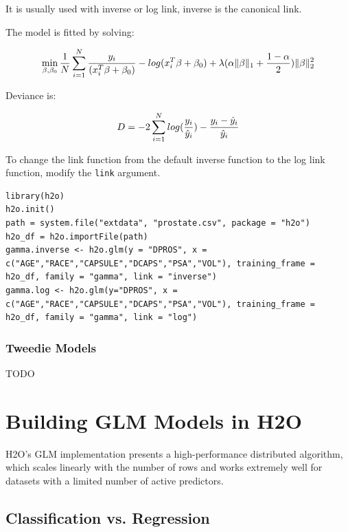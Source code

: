 It is usually used with inverse or log link, inverse is the canonical link.

The model is fitted by solving:

\[  \min\limits_{\beta,\beta_0} { {1 \over N}\sum\limits_{i=1}\limits^{N}{y_i \over (x_i^{T}\beta  + \beta_0)} - log({x_i^{T}\beta  + \beta_0})  + \lambda (\alpha \|\beta \|_1 + {1-\alpha \over 2}) \| \beta \|_2^2} \]

Deviance is:

\[D = -2\sum\limits_{i=1}\limits^{N}{log({y_i \over \hat{y}_i}) - {y_i - \hat{y}_i \over\hat{y}_i }}\]

\waterExampleInR

To change the link function from the default inverse function to the log link function, modify the \texttt{link}
argument.

\begin{lstlisting}[style=R]
library(h2o)
h2o.init()
path = system.file("extdata", "prostate.csv", package = "h2o")
h2o_df = h2o.importFile(path)
gamma.inverse <- h2o.glm(y = "DPROS", x = c("AGE","RACE","CAPSULE","DCAPS","PSA","VOL"), training_frame = h2o_df, family = "gamma", link = "inverse")
gamma.log <- h2o.glm(y="DPROS", x = c("AGE","RACE","CAPSULE","DCAPS","PSA","VOL"), training_frame = h2o_df, family = "gamma", link = "log")
\end{lstlisting}

\subsubsection{Tweedie Models}

TODO


\section{Building GLM Models in H2O}

H2O's GLM implementation presents a high-performance distributed algorithm, which scales linearly with the number
of rows and works extremely well for datasets with a limited number of active predictors.

\subsection{Classification vs. Regression}

